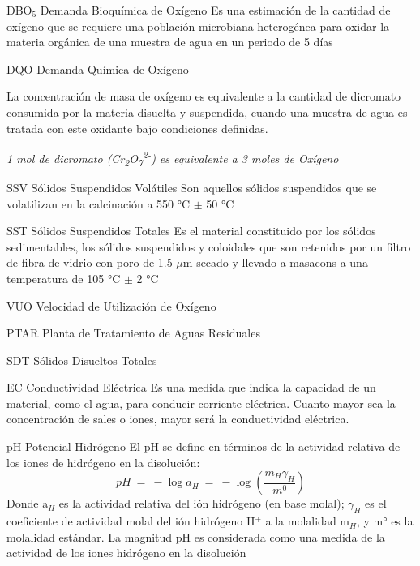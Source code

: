 	{DBO$_{5}$}            %
	{Demanda Bioquímica de Oxígeno}  %
	{Es una estimación de la cantidad de oxígeno que se requiere una población microbiana heterogénea para oxidar la materia orgánica de una muestra de agua en un periodo de 5 días} %

	{DQO}
	{Demanda Química de Oxígeno}
	{La concentración de masa de oxígeno es equivalente a la cantidad de dicromato consumida por la materia disuelta y suspendida, cuando una muestra de agua es tratada con este oxidante bajo condiciones definidas.
		\begin{center}
			\emph{1 mol de dicromato (Cr\textsubscript{2}O\textsubscript{7}\textsuperscript{2-}) es equivalente a 3 moles de Oxígeno}
		\end{center}
	}

	{SSV}
	{Sólidos Suspendidos Volátiles}
	{Son aquellos sólidos suspendidos que se volatilizan en la calcinación a 550 °C $\pm$ 50 °C}

	{SST}
	{Sólidos Suspendidos Totales}
	{Es el material constituido por los sólidos sedimentables, los sólidos suspendidos y coloidales que son retenidos por un filtro de fibra de vidrio con poro de 1.5 $\mu$m secado y llevado a \gls{masacons} a una temperatura de 105 °C $\pm$ 2 °C}

	{VUO}
	{Velocidad de Utilización de Oxígeno}
	{}

	{PTAR}
	{Planta de Tratamiento de Aguas Residuales}
	{}
	
	{SDT}
	{Sólidos Disueltos Totales}
	{}
	
	{EC}
	{Conductividad Eléctrica}
	{Es una medida que indica la capacidad de un material, como el agua, para conducir corriente eléctrica. Cuanto mayor sea la concentración de sales o iones, mayor será la conductividad eléctrica.}

	{pH}
	{Potencial Hidrógeno}
	{El pH se define en términos de la actividad relativa de los iones de hidrógeno en la disolución:
		$$pH\ =\ -\log a_{H}\ =\ -\log (\frac{m_{H}\gamma_{H}}{m^{0}})$$
	Donde a$_{H}$ es la actividad relativa del ión hidrógeno (en base molal); $\gamma_{H}$ es el coeficiente de actividad molal del ión hidrógeno H$^{+}$ a la molalidad m$_{H}$, y m° es la molalidad estándar. La magnitud pH es considerada como una medida de la actividad de los iones hidrógeno en la disolución}

